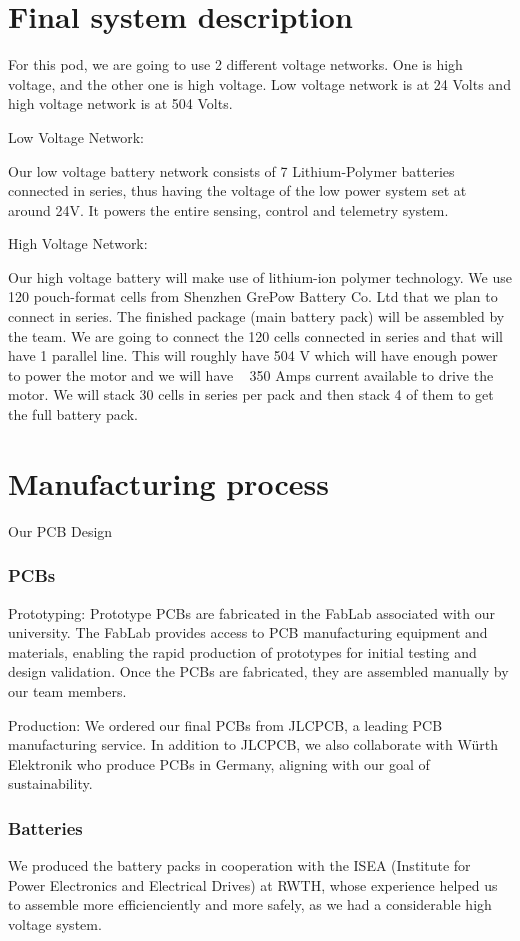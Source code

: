 \section{Final system description}
For this pod, we are going to use 2 different voltage networks. One is high voltage, and the other one is high voltage. Low voltage network is at 24 Volts and high voltage network is at 504 Volts.

Low Voltage Network:

Our low voltage battery network consists of 7 Lithium-Polymer batteries connected in series, thus having the voltage of the low power system set at around 24V. It powers the entire sensing, control and telemetry system. 

High Voltage Network:

Our high voltage battery will make use of lithium-ion polymer technology. We use 120 pouch-format cells from Shenzhen GrePow Battery Co. Ltd that we plan to connect in series. The finished package (main battery pack) will be assembled by the team.
We are going to connect the 120 cells connected in series and that will have 1 parallel line. This will roughly have 504 V which will have enough power to power the motor and we will have ~ 350 Amps current available to drive the motor. We will stack 30 cells in series per pack and then stack 4 of them to get the full battery pack.



\section{Manufacturing process}
Our PCB Design
\subsubsection{PCBs}
\par Prototyping: Prototype PCBs are fabricated in the FabLab associated with our university. The FabLab provides access to PCB manufacturing equipment and materials, enabling the rapid production of prototypes for initial testing and design validation.
    Once the PCBs are fabricated, they are assembled manually by our team members. 
\par Production: We ordered our final PCBs from JLCPCB, a leading PCB manufacturing service. In addition to JLCPCB, we also collaborate with Würth Elektronik who produce 
PCBs in Germany, aligning with our goal of sustainability.
\subsubsection{Batteries}
We produced the battery packs in cooperation with the ISEA (Institute for Power Electronics and Electrical Drives) at RWTH, whose experience helped us to assemble
more efficienciently and more safely, as we had a considerable high voltage system.
